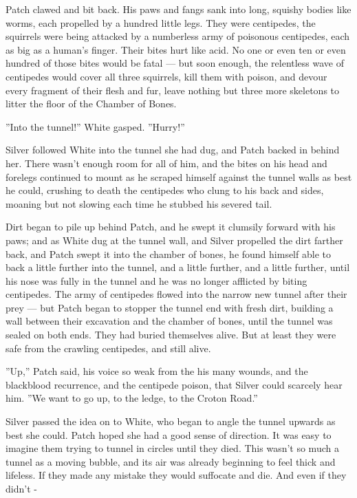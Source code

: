 \documentclass[12pt]{book}
\begin{document}
Patch clawed and bit back. His paws and fangs sank into long, squishy bodies like worms, each propelled by a hundred little legs. They were centipedes, the squirrels were being attacked by a numberless army of poisonous centipedes, each as big as a human's finger. Their bites hurt like acid. No one or even ten or even hundred of those bites would be fatal ---
but soon enough, the relentless wave of centipedes would cover all three squirrels, kill them with poison, and devour every fragment of their flesh and fur, leave nothing but three more skeletons to litter the floor of the Chamber of Bones.

''Into the tunnel!'' White gasped. ''Hurry!''

Silver followed White into the tunnel she had dug, and Patch backed in behind her. There wasn't enough room for all of him, and the bites on his head and forelegs continued to mount as he scraped himself against the tunnel walls as best he could, crushing to death the centipedes who clung to his back and sides, moaning but not slowing each time he stubbed his severed tail.

Dirt began to pile up behind Patch, and he swept it clumsily forward with his paws; and as White dug at the tunnel wall, and Silver propelled the dirt farther back, and Patch swept it into the chamber of bones, he found himself able to back a little further into the tunnel, and a little further, and a little further, until his nose was fully in the tunnel and he was no longer afflicted by biting centipedes. The army of centipedes flowed into the narrow new tunnel after their prey ---
but Patch began to stopper the tunnel end with fresh dirt, building a wall between their excavation and the chamber of bones, until the tunnel was sealed on both ends. They had buried themselves alive. But at least they were safe from the crawling centipedes, and still alive.

''Up,'' Patch said, his voice so weak from the his many wounds, and the blackblood recurrence, and the centipede poison, that Silver could scarcely hear him. ''We want to go up, to the ledge, to the Croton Road.''

Silver passed the idea on to White, who began to angle the tunnel upwards as best she could. Patch hoped she had a good sense of direction. It was easy to imagine them trying to tunnel in circles until they died. This wasn't so much a tunnel as a moving bubble, and its air was already beginning to feel thick and lifeless. If they made any mistake they would suffocate and die. And even if they didn't -
\end{document}
